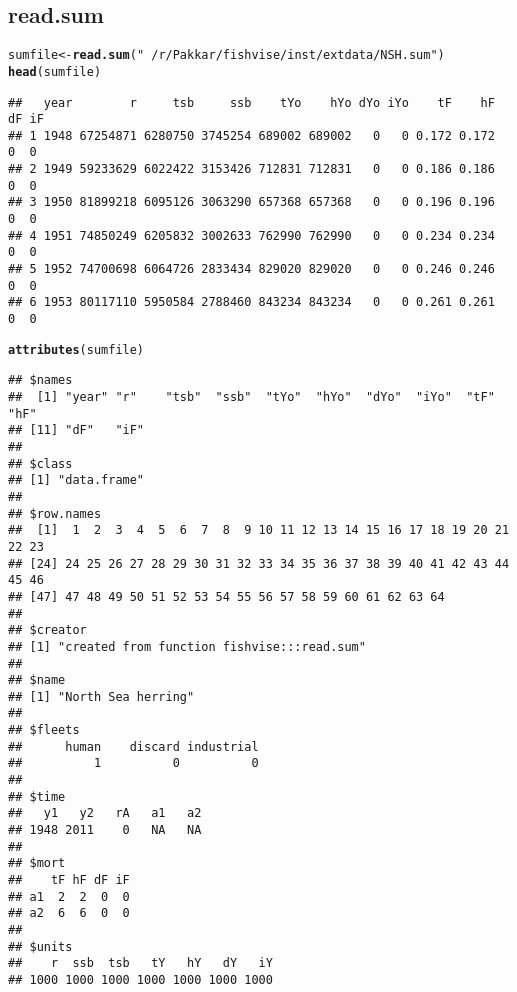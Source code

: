 \documentclass[a4paper]{article}\usepackage{graphicx, color}
\makeatletter
\newcommand{\hlfunctioncall}[1]{\textcolor[rgb]{0.501960784313725,0,0.329411764705882}{\textbf{#1}}}%
\newcommand{\hlstring}[1]{\textcolor[rgb]{0.6,0.6,1}{#1}}%
\newenvironment{kframe}{%
 \def\at@end@of@kframe{}%
 \ifinner\ifhmode%
  \def\at@end@of@kframe{\end{minipage}}%
  \begin{minipage}{\columnwidth}%
 \fi\fi%
 \def\FrameCommand##1{\hskip\@totalleftmargin \hskip-\fboxsep
 \colorbox{shadecolor}{##1}\hskip-\fboxsep
     \hskip-\linewidth \hskip-\@totalleftmargin \hskip\columnwidth}%
 \MakeFramed {\advance\hsize-\width
   \@totalleftmargin\z@ \linewidth\hsize
   \@setminipage}}%
 {\par\unskip\endMakeFramed%
 \at@end@of@kframe}
\newenvironment{knitrout}{}{} %
\makeatother
\begin{document}
\subsection*{read.sum}
\begin{knitrout}
\color{fgcolor}\begin{kframe}
\begin{alltt}
sumfile <- \hlfunctioncall{read.sum}(\hlstring{"~/r/Pakkar/fishvise/inst/extdata/NSH.sum"})
\hlfunctioncall{head}(sumfile)
\end{alltt}
\begin{verbatim}
##   year        r     tsb     ssb    tYo    hYo dYo iYo    tF    hF dF iF
## 1 1948 67254871 6280750 3745254 689002 689002   0   0 0.172 0.172  0  0
## 2 1949 59233629 6022422 3153426 712831 712831   0   0 0.186 0.186  0  0
## 3 1950 81899218 6095126 3063290 657368 657368   0   0 0.196 0.196  0  0
## 4 1951 74850249 6205832 3002633 762990 762990   0   0 0.234 0.234  0  0
## 5 1952 74700698 6064726 2833434 829020 829020   0   0 0.246 0.246  0  0
## 6 1953 80117110 5950584 2788460 843234 843234   0   0 0.261 0.261  0  0
\end{verbatim}
\begin{alltt}
\hlfunctioncall{attributes}(sumfile)
\end{alltt}
\begin{verbatim}
## $names
##  [1] "year" "r"    "tsb"  "ssb"  "tYo"  "hYo"  "dYo"  "iYo"  "tF"   "hF"  
## [11] "dF"   "iF"  
## 
## $class
## [1] "data.frame"
## 
## $row.names
##  [1]  1  2  3  4  5  6  7  8  9 10 11 12 13 14 15 16 17 18 19 20 21 22 23
## [24] 24 25 26 27 28 29 30 31 32 33 34 35 36 37 38 39 40 41 42 43 44 45 46
## [47] 47 48 49 50 51 52 53 54 55 56 57 58 59 60 61 62 63 64
## 
## $creator
## [1] "created from function fishvise:::read.sum"
## 
## $name
## [1] "North Sea herring"
## 
## $fleets
##      human    discard industrial 
##          1          0          0 
## 
## $time
##   y1   y2   rA   a1   a2 
## 1948 2011    0   NA   NA 
## 
## $mort
##    tF hF dF iF
## a1  2  2  0  0
## a2  6  6  0  0
## 
## $units
##    r  ssb  tsb   tY   hY   dY   iY 
## 1000 1000 1000 1000 1000 1000 1000
\end{verbatim}
\end{kframe}
\end{knitrout}

\newpage{}
\end{document}
